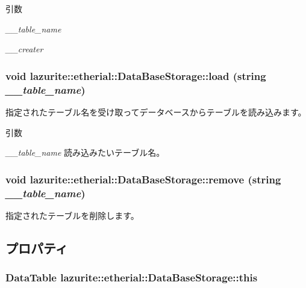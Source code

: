 \begin{DoxyParams}{引数}
\item[{\em \_\-\_\-table\_\-name}]\item[{\em \_\-\_\-creater}]\end{DoxyParams}
\hypertarget{classlazurite_1_1etherial_1_1_data_base_storage_aa7942198cc4237c33f8867f717c052bf}{
\subsubsection[{load}]{\setlength{\rightskip}{0pt plus 5cm}void lazurite::etherial::DataBaseStorage::load (string {\em \_\-\_\-table\_\-name})}}
\label{classlazurite_1_1etherial_1_1_data_base_storage_aa7942198cc4237c33f8867f717c052bf}
指定されたテーブル名を受け取ってデータベースからテーブルを読み込みます。 
\begin{DoxyParams}{引数}
\item[{\em \_\-\_\-table\_\-name}]読み込みたいテーブル名。 \end{DoxyParams}
\hypertarget{classlazurite_1_1etherial_1_1_data_base_storage_a4dfd199a157268d3e6e0d356b7031bdd}{
\subsubsection[{remove}]{\setlength{\rightskip}{0pt plus 5cm}void lazurite::etherial::DataBaseStorage::remove (string {\em \_\-\_\-table\_\-name})}}
\label{classlazurite_1_1etherial_1_1_data_base_storage_a4dfd199a157268d3e6e0d356b7031bdd}
指定されたテーブルを削除します。 

\subsection{プロパティ}
\hypertarget{classlazurite_1_1etherial_1_1_data_base_storage_a651282825d26768b12357ec12f0bf9ab}{
\subsubsection[{this}]{\setlength{\rightskip}{0pt plus 5cm}DataTable lazurite::etherial::DataBaseStorage::this}}
\label{classlazurite_1_1etherial_1_1_data_base_storage_a651282825d26768b12357ec12f0bf9ab}

